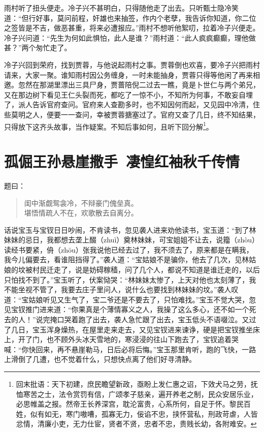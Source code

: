 \documentclass[12pt,oneside]{book}
\newenvironment{shici}{%
\begin{verse}%
\centering\large\hspace{12pt}}%
{\end{verse}}
\begin{document}
雨村听了扭头便走。冷子兴不甚明白，只得随他走了出去。只听甄士隐冷笑道：“但行好事，莫问前程，奸雄也来抽签，作内个老孽，我告诉你知道，你二位之签皆是不吉，做恶甚重，将来必遭报应。”雨村不想听他絮叨，拉着冷子兴便走。冷子兴问道：“先生为何如此惧怕，此人是谁？”雨村道：“此人疯疯癫癫，理他做甚？”两个匆忙走了。

冷子兴回到荣府，找到贾蓉，与他说起雨村之事。贾蓉倒也欢喜，要冷子兴把雨村请来，大家一聚。谁知雨村因公务缠身，一时未能抽身，贾蓉只得等他闲了再来相邀。忽然在那湖里漂出三具尸身，贾蔷陪倪二过去一瞧，竟是卜世仁与两个弟兄，又在那边树下看见王仁头裂而死，都吃了一惊不小，不知所为何事，不敢妄自埋了，派人告诉官府查问。官府来人查勘多时，也不知因何而起，又见园中冷清，住些莫明之人，便要一一查问，幸被贾蓉搪塞过了。官府又查了几日，终不知结果，只得放下这齐头故事，当作疑案。不知后事如何，且听下回分解\footnote{回末批语：天下初建，庶民瞻望新政，亟盼上发仁惠之诏，下效犬马之劳，抚恤寒苦之士，法令赏罚有信，广颂孝子慈亲，遍开养老之制，民众安居乐业，必思帷盖之报。然帝王长养深宫，耽沦富贵，心系所何，自足于怀。黎民百姓，似有如无，寒门嗷嘈，孤寡无力，佞谄不忠，挟怀营私，刑政苛虐，人皆忿情，清廉小吏，无力仕宦，贤者不贤，忠者不忠，贵贱长幼，各附难安。}。



\chapter{孤倔王孙悬崖撒手~凄惶红袖秋千传情}
题曰：

\begin{shici}
闺中渐觑鸳衾冷，不辩豪门傀垒真。\\
堪悟情疏人不在，欢歌散去自离分。
\end{shici}


话说宝玉与宝钗日日吵闹，不肯读书，忽见袭人进来劝他读书，宝玉道：“到了林妹妹的忌日，我都想去垄上醊（zhuì）奠林妹妹，可宝姐姐不让去，说籀（zhòu）读经书要紧，侜（zhōu）张我说他已经去过了，我不须去了，原来都是在瞒我，我今儿偏要去，看谁阻挡得了。”袭人道：“宝姑娘不是骗你，他去了几次，见林姑娘的坟被村民迁走了，说是妨碍稼穑，问了几个人，都说不知道是谁迁走的，以后只怕找不到了。”宝玉听了，伏案恸哭：“林妹妹太惨了，上天对他也太刻薄了，我不能坐视不管了，我要去庄子里问人，说什么也要找到林妹妹的坟。”袭人叹道：“宝姑娘听见又生气了，宝二爷还是不要去了，只怕难找。”宝玉不觉大哭，忽见宝钗推门进来道：“你果真是个薄情寡义之人，我操了这么多心，还不如一个死去的人！”说完掩口哭着跑了出去，袭人急忙跟了出去，宝玉低头不语啜泣。又过了几日，宝玉浑身燥热，在屋里走来走去，又见宝钗进来谏诤，硬是把宝钗推坐床上，开了门，也不顾外头冰天雪地的，寒浸浸的往山下跑去了，宝钗追着哭喊：“你快回来，再不悬崖勒马，日后必将后悔。”宝玉那里肯听，跑的飞快，一路上滑倒了几遭，也不觉着什么，只想快点离了他们好寻清静。
\end{document}
